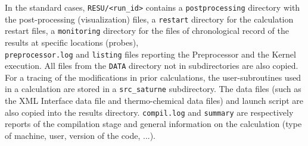 \noindent
In the standard cases, \texttt{RESU/<run\_id>} contains a
\texttt{postprocessing} directory with the post-processing
(visualization) files, a \texttt{restart} directory for the calculation
restart files, a \texttt{monitoring} directory for the files of chronological
record of the results at specific locations (probes),\\
\texttt{preprocessor.log} and \texttt{listing} files reporting the
Preprocessor and the Kernel execution. All files from the \texttt{DATA}
directory not in subdirectories are also copied. For a tracing of
the modifications in prior calculations, the user-subroutines used in
a calculation are stored in a \texttt{src\_saturne} subdirectory. The data files
(such as the XML Interface data file and thermo-chemical data files) and
launch script are also copied into the results directory. \texttt{compil.log} and
\texttt{summary} are respectively reports of the compilation stage and
general information on the calculation (type of machine, user,
version of the code, ...).

